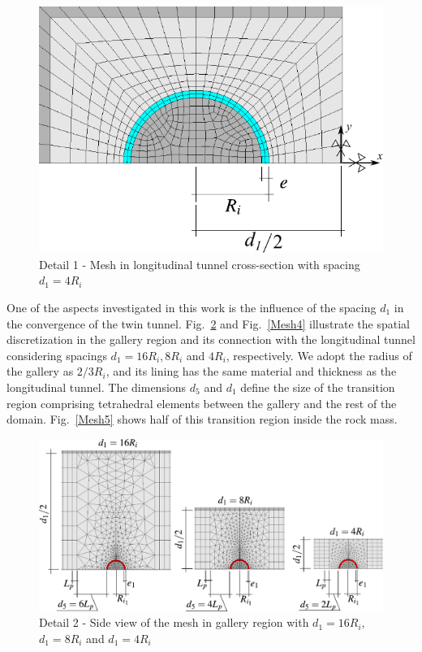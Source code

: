 \documentclass[a4paper,fleqn]{cas-sc}
\begin{document}
\begin{figure}[h!]
	\centering
	\includegraphics[scale=0.8]{Mesh2.pdf}
	\caption{Detail 1 - Mesh in longitudinal tunnel cross-section with spacing $d_1=4R_i$}
	\label{Mesh2}
\end{figure}
\FloatBarrier
One of the aspects investigated in this work is the influence of the spacing $d_1$ in the convergence of the twin tunnel. Fig.~\ref{Mesh3} and Fig.~\ref{Mesh4} illustrate the spatial discretization in the gallery region and its connection with the longitudinal tunnel considering spacings $d_1 = 16R_i, 8R_i$ and $4R_i$, respectively. We adopt the radius of the gallery as $2/3R_i$, and its lining has the same material and thickness as the longitudinal tunnel. The dimensions $d_5$ and $d_1$ define the size of the transition region comprising tetrahedral elements between the gallery and the rest of the domain. Fig.~\ref{Mesh5} shows half of this transition region inside the rock mass.
\begin{figure}[h!]
	\centering
	\includegraphics[scale=0.8]{Mesh3.pdf}
	\caption{Detail 2 - Side view of the mesh in gallery region with $d_1=16R_i$, $d_1=8R_i$ and $d_1=4R_i$}
	\label{Mesh3}
\end{figure}
\end{document}
